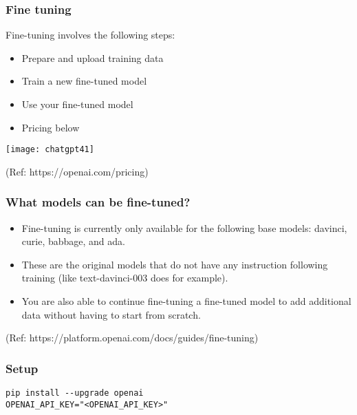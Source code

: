 \begin{frame}[fragile]\frametitle{Fine tuning}

Fine-tuning involves the following steps:

\begin{itemize}
\item Prepare and upload training data
\item Train a new fine-tuned model
\item Use your fine-tuned model
\item Pricing below
\end{itemize}	 

\begin{center}
\texttt{[image: chatgpt41]}

{\tiny (Ref: https://openai.com/pricing)}

\end{center}		

\end{frame}

\begin{frame}[fragile]\frametitle{What models can be fine-tuned?}

\begin{itemize}
\item Fine-tuning is currently only available for the following base models: davinci, curie, babbage, and ada. 
\item These are the original models that do not have any instruction following training (like text-davinci-003 does for example). 
\item You are also able to continue fine-tuning a fine-tuned model to add additional data without having to start from scratch.
\end{itemize}	 


{\tiny (Ref: https://platform.openai.com/docs/guides/fine-tuning)}
\end{frame}

\begin{frame}[fragile]\frametitle{Setup}

\begin{lstlisting}
pip install --upgrade openai
OPENAI_API_KEY="<OPENAI_API_KEY>"
\end{lstlisting}	 

\end{frame}

